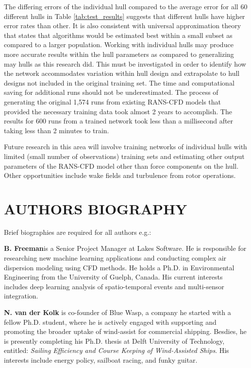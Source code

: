 \documentclass[twoside,twocolumn]{article}
\begin{document}
The differing errors of the individual hull compared to the average error for all 60 different hulls in Table \ref{tab:test_results} suggests that different hulls have higher error rates than other. It is also consistent with universal approximation theory that states that algorithms would be estimated best within a small subset as compared to a larger population. Working with individual hulls may produce more accurate results within the hull parameters as compared to generalizing may hulls as this research did. This must be investigated in order to identify how the network accommodates variation within hull design and extrapolate to hull designs not included in the original training set.
The time and computational saving for additional runs should not be underestimated. The process of generating the original 1,574 runs from existing RANS-CFD models that provided the necessary training data took almost 2 years to accomplish. The results for 600 runs from a trained network took less than a millisecond after taking less than 2 minutes to train.

Future research in this area will involve training networks of individual hulls with limited (small number of observations) training sets and estimating other output parameters of the RANS-CFD model other than force components on the hull. Other opportunities include wake fields and turbulence from rotor operations. 



\section{AUTHORS BIOGRAPHY}

Brief biographies are required for all authors e.g.:

\textbf{B. Freeman}is a Senior Project Manager at Lakes Software.  He is responsible for researching new machine learning applications and conducting complex air dispersion modeling using CFD methods.  He holds a Ph.D. in Environmental Engineering from the University of Guelph, Canada. His current interests includes deep learning analysis of spatio-temporal events and multi-sensor integration.

\textbf{N. van der Kolk} is co-founder of Blue Wasp, a company he started with a fellow Ph.D. student, where he is actively engaged with supporting and promoting the broader uptake of wind-assist for commercial shipping. Besdies, he is presently completing his Ph.D. thesis at Delft University of Technology, entitled: \textit{Sailing Efficiency and Course Keeping of Wind-Assisted Ships}. His interests include energy policy, sailboat racing, and funky guitar.




{}
\end{document}
